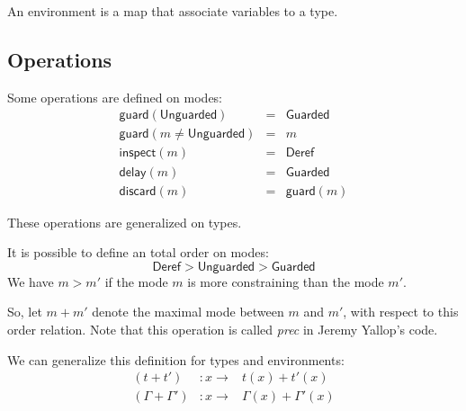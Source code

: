\documentclass{article}
\newcommand{\Deref}{\mathsf{Deref}}
\newcommand{\Unguarded}{\mathsf{Unguarded}}
\newcommand{\Guarded}{\mathsf{Guarded}}
\newcommand{\inspect}{\mathsf{inspect}}
\newcommand{\guard}{\mathsf{guard}}
\newcommand{\discard}{\mathsf{discard}}
\newcommand{\delay}{\mathsf{delay}}
\begin{document}

An environment is a map that associate variables to a type.

\subsection{Operations}
Some operations are defined on modes:
\begin{displaymath}
  \begin{array}{lll}
    \guard(\Unguarded)              & = & \Guarded \\
    \guard(m \neq \Unguarded)       & = & m        \\
    \inspect(m)                     & = & \Deref   \\
    \delay(m)                       & = & \Guarded \\
    \discard(m)                     & = & \guard(m)
  \end{array}
\end{displaymath}

These operations are generalized on types.


It is possible to define an total order on modes:
$$\Deref > \Unguarded > \Guarded$$
We have $m > m'$ if the mode $m$ is more constraining than the mode $m'$.

So, let $m + m'$ denote the maximal mode between $m$ and $m'$, with respect to
this order relation. Note that this operation is called \textit{prec} in
Jeremy Yallop's code.

We can generalize this definition for types and environments:
\begin{displaymath}
  \begin{array}{lll}
    (t + t')           & : x \rightarrow & t(x) + t'(x) \\
    (\Gamma + \Gamma') & : x \rightarrow & \Gamma(x) + \Gamma'(x)
  \end{array}
\end{displaymath}
\end{document}
